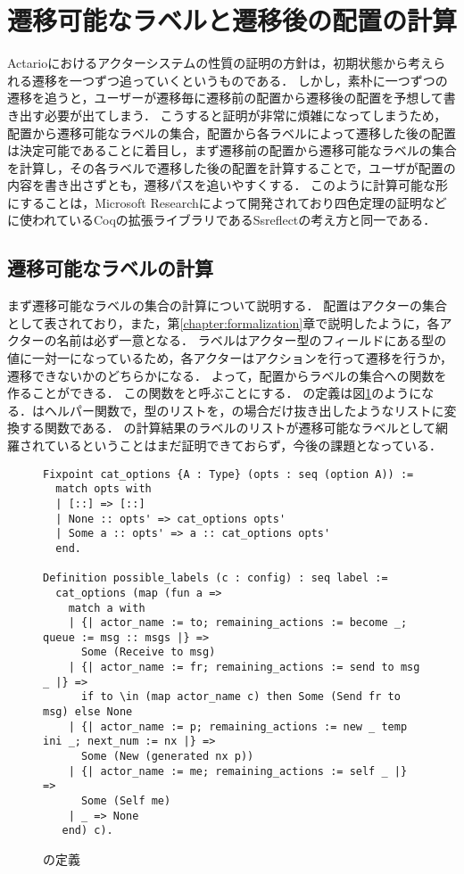 \section{遷移可能なラベルと遷移後の配置の計算}

Actarioにおけるアクターシステムの性質の証明の方針は，初期状態から考えられる遷移を一つずつ追っていくというものである．
しかし，素朴に一つずつの遷移を追うと，ユーザーが遷移毎に遷移前の配置から遷移後の配置を予想して書き出す必要が出てしまう．
こうすると証明が非常に煩雑になってしまうため，配置から遷移可能なラベルの集合，配置から各ラベルによって遷移した後の配置は決定可能であることに着目し，まず遷移前の配置から遷移可能なラベルの集合を計算し，その各ラベルで遷移した後の配置を計算することで，ユーザが配置の内容を書き出さずとも，遷移パスを追いやすくする．
このように計算可能な形にすることは，Microsoft Researchによって開発されており四色定理の証明などに使われているCoqの拡張ライブラリであるSsreflect\cite{ssreflect}の考え方と同一である．

\subsection{遷移可能なラベルの計算}

まず遷移可能なラベルの集合の計算について説明する．
配置はアクターの集合として表されており，また，第\ref{chapter:formalization}章で説明したように，各アクターの名前は必ず一意となる．
ラベルはアクター型のフィールドにある型の値に一対一になっているため，各アクターはアクションを行って遷移を行うか，遷移できないかのどちらかになる．
よって，配置からラベルの集合への関数を作ることができる．
この関数をと呼ぶことにする．
の定義は図\ref{code:proof:possible-labels}のようになる．はヘルパー関数で，型のリストを，の場合だけ抜き出したようなリストに変換する関数である．
の計算結果のラベルのリストが遷移可能なラベルとして網羅されているということはまだ証明できておらず，今後の課題となっている．


\begin{figure}
\begin{lstlisting}
Fixpoint cat_options {A : Type} (opts : seq (option A)) :=
  match opts with
  | [::] => [::]
  | None :: opts' => cat_options opts'
  | Some a :: opts' => a :: cat_options opts'
  end.

Definition possible_labels (c : config) : seq label :=
  cat_options (map (fun a =>
    match a with
    | {| actor_name := to; remaining_actions := become _; queue := msg :: msgs |} =>
      Some (Receive to msg)
    | {| actor_name := fr; remaining_actions := send to msg _ |} =>
      if to \in (map actor_name c) then Some (Send fr to msg) else None
    | {| actor_name := p; remaining_actions := new _ temp ini _; next_num := nx |} =>
      Some (New (generated nx p))
    | {| actor_name := me; remaining_actions := self _ |} =>
      Some (Self me)
    | _ => None
   end) c).
\end{lstlisting}
\caption{の定義}\label{code:proof:possible-labels}
\end{figure}

